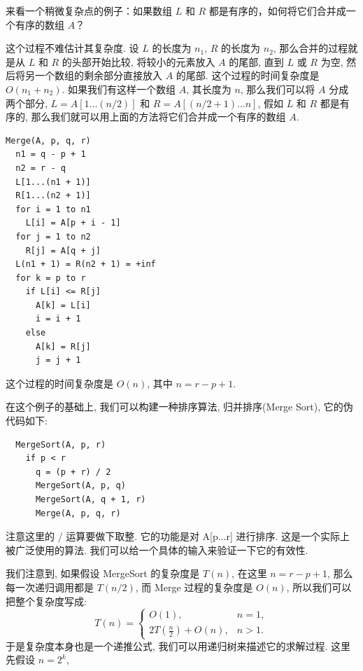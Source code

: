 \documentclass[a4paper]{ctexart}
\theoremstyle{definition}
\theoremstyle{definition}
\begin{document}

来看一个稍微复杂点的例子：如果数组 $L$ 和 $R$ 都是有序的，如何将它们合并成一个有序的数组 $A$？

这个过程不难估计其复杂度. 设 $L$ 的长度为 $n_1$, $R$ 的长度为 $n_2$, 那么合并的过程就是从 $L$ 和 $R$ 的头部开始比较,
将较小的元素放入 $A$ 的尾部, 直到 $L$ 或 $R$ 为空, 然后将另一个数组的剩余部分直接放入 $A$ 的尾部.
这个过程的时间复杂度是 $O(n_1 + n_2)$. 如果我们有这样一个数组 $A$, 其长度为 $n$, 
那么我们可以将 $A$ 分成两个部分, $L = A[1...(n/2)]$ 和 $R = A[(n/2 + 1)...n]$, 假如 $L$ 和 $R$ 都是有序的, 
那么我们就可以用上面的方法将它们合并成一个有序的数组 $A$.


\begin{verbatim}
Merge(A, p, q, r)
  n1 = q - p + 1
  n2 = r - q 
  L[1...(n1 + 1)]
  R[1...(n2 + 1)]
  for i = 1 to n1
    L[i] = A[p + i - 1]
  for j = 1 to n2
    R[j] = A[q + j]
  L(n1 + 1) = R(n2 + 1) = +inf
  for k = p to r
    if L[i] <= R[j]
      A[k] = L[i]
      i = i + 1
    else
      A[k] = R[j]
      j = j + 1
\end{verbatim}    

这个过程的时间复杂度是 $O(n)$, 其中 $n = r - p + 1$.

在这个例子的基础上, 我们可以构建一种排序算法, 归并排序(Merge Sort), 它的伪代码如下:
\begin{verbatim}
  MergeSort(A, p, r)
    if p < r
      q = (p + r) / 2
      MergeSort(A, p, q)
      MergeSort(A, q + 1, r)
      Merge(A, p, q, r)
\end{verbatim}
注意这里的 / 运算要做下取整. 它的功能是对 A[p...r] 进行排序. 这是一个实际上被广泛使用的算法. 
我们可以给一个具体的输入来验证一下它的有效性.

我们注意到, 如果假设 MergeSort 的复杂度是 $T(n)$, 在这里 $n = r - p + 1$, 
那么每一次递归调用都是 $T(n / 2)$, 而 Merge 过程的复杂度是 $O(n)$, 所以我们可以把整个复杂度写成:
\begin{equation}
  T(n) = \left\{
    \begin{array}{ll}
      O(1), & n = 1, \\
      2 T(\frac{n}{2}) + O(n), & n > 1.
    \end{array}
  \right.
\end{equation}
于是复杂度本身也是一个递推公式, 我们可以用递归树来描述它的求解过程. 这里先假设 $n = 2^k$,
\end{document}
